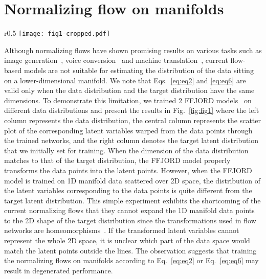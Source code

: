 \documentclass{article}
\begin{document}
\section{Normalizing flow on manifolds}
\begin{wrapfigure}{r}{0.5\textwidth}
\vskip -5pt
\texttt{[image: fig1-cropped.pdf]} 
\caption{Illustration of normalizing flow trained on 2D data distribution~(top) and 1D manifold data distribution~(bottom).}
\label{fig:fig1}
\end{wrapfigure}
Although normalizing flows have shown promising results on various tasks such as image generation~\citep{kingma2018glow}, voice conversion~\citep{serra2019blow} and machine translation~\citep{ma2019flowseq}, current flow-based models are not suitable for estimating the distribution of the data sitting on a lower-dimensional manifold. We note that Eqs.~\eqref{eq:eq2} and \eqref{eq:eq6} are valid only when the data distribution and the target distribution have the same dimensions. 
To demonstrate this limitation, we trained 2 FFJORD models~\citep{grathwohl2018ffjord} on different data distributions and present the results in Fig.~\ref{fig:fig1} where the left column represents the data distribution, the central column represents the scatter plot of the corresponding latent variables warped from the data points through the trained networks, and the right column denotes the target latent distribution that we initially set for training. When the dimension of the data distribution matches to that of the target distribution, the FFJORD model properly transforms the data points into the latent points. However, when the FFJORD model is trained on 1D manifold data scattered over 2D space, the distribution of the latent variables corresponding to the data points is quite different from the target latent distribution. This simple experiment exhibits the shortcoming of the current normalizing flows that they cannot expand the 1D manifold data points to the 2D shape of the target distribution since the transformations used in flow networks are homeomorphisms~\citep{dupont2019augmented}. If the transformed latent variables cannot represent the whole 2D space, it is unclear which part of the data space would match the latent points outside the lines. The observation suggests that training the normalizing flows on manifolds according to Eq.~\eqref{eq:eq2} or Eq.~\eqref{eq:eq6} may result in degenerated performance. 
\end{document}

